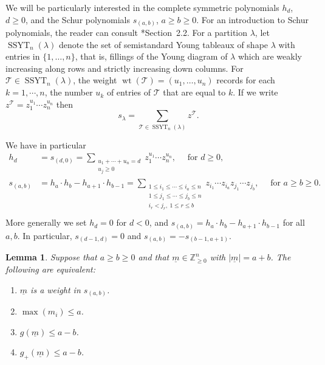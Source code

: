 \documentclass[11pt,reqno]{amsart}
\newcommand{\defi}[1]{{\upshape\sffamily #1}}
\renewcommand{\ll}{\lambda}
\newcommand{\bb}[1]{\mathbb{#1}}
\newcommand{\mc}[1]{\mathcal{#1}}
\newcommand{\ul}[1]{\underline{#1}}
\newtheorem{lemma}[theorem]{Lemma}
\theoremstyle{definition}
\theoremstyle{remark}
\numberwithin{equation}{section}
\begin{document}
We will be particularly interested in the \defi{complete symmetric polynomials $h_d$}, $d\geq 0$, and the \defi{Schur polynomials $s_{(a,b)}$}, $a\geq b\geq 0$. For an introduction to Schur polynomials, the reader can consult \cite{fulton-YT}*{Section~2.2}. For a partition $\lambda$, let $\operatorname{SSYT}_n(\lambda)$ denote the set
of semistandard Young tableaux of shape $\lambda$ with entries in
$\{1,\dots,n\}$, that is, fillings of the Young diagram of $\lambda$ which are
weakly increasing along rows and strictly increasing down columns. For
$\mc{T}\in \operatorname{SSYT}_n(\lambda)$, the weight $\operatorname{wt}(\mc{T})=(u_1,\dots,u_n)$ records for each $k=1,\cdots,n$, the number $u_k$ of entries of $\mc{T}$ that are equal to $k$. If we write $z^{\mc{T}} = z_1^{u_1}\cdots z_n^{u_n}$ then
\[ s_{\ll} = \sum_{\mc{T}\in \operatorname{SSYT}_n(\lambda)} z^{\mc{T}}.\]

We have in particular
\begin{equation}
\begin{aligned}
    h_d &= s_{(d,0)} = \sum_{\substack{u_1+\cdots+u_n = d \\ u_j\geq 0}}z_1^{u_1}\cdots z_n^{u_n},\quad\text{ for }d\geq 0,\\
    s_{(a,b)} &= h_a\cdot h_b-h_{a+1}\cdot h_{b-1}=\sum_{\substack{
1\le i_1\le\cdots\le i_a\le n\\
1\le j_1\le\cdots\le j_b\le n\\
i_r<j_r,\ 1\le r\le b
}}
z_{i_1}\cdots z_{i_a}z_{j_1}\cdots z_{j_b},\quad\text{ for }a\geq b\geq 0.\\
\end{aligned}
\label{eq:def-hd-sab}
\end{equation}
More generally we set $h_d=0$ for $d<0$, and $s_{(a,b)} = h_a\cdot h_b-h_{a+1}\cdot h_{b-1}$ for all $a,b$. In particular, $s_{(d-1,d)}=0$ and $s_{(a,b)}=-s_{(b-1,a+1)}$.

\begin{lemma}\label{lem:wts-in-sab}
    Suppose that $a\geq b\geq 0$ and that $\ul{m}\in\bb{Z}^n_{\geq 0}$ with $|\ul{m}|=a+b$. The following are equivalent:
    \begin{enumerate}
        \item $\ul{m}$ is a weight in $s_{(a,b)}$.
        \item $\max(m_i)\leq a$.
        \item $g(\ul{m})\leq a-b$.
        \item $g_+(\ul{m})\leq a-b$.
    \end{enumerate}
\end{lemma}
\end{document}

